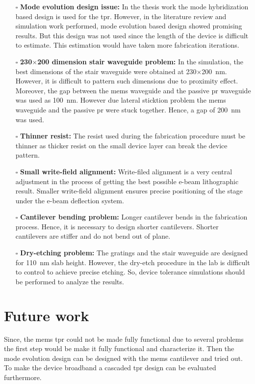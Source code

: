 \documentclass[../report.tex]{subfiles}
\begin{document}
\begin{itemize}	
	\item[$\square$] \textbf{Mode evolution design issue:} In the thesis work the mode hybridization based design is used for the \gls{tpr}. However, in the literature review and simulation work performed, mode evolution based design showed promising results. But this design was not used since the length of the device is difficult to estimate. This estimation would have taken more fabrication iterations. 
	\item[$\square$] \textbf{230$\times$200 dimension stair waveguide problem:} In the simulation, the best dimensions of the stair waveguide were obtained at 230$\times$\SI{200}{\nano\meter}. However, it is difficult to pattern such dimensions due to proximity effect. Moreover, the gap between the \gls{mems} waveguide and the passive \gls{pr} waveguide was used as \SI{100}{\nano\meter}. However due lateral sticktion problem the \gls{mems} waveguide and the passive \gls{pr} were stuck together. Hence, a gap of \SI{200}{\nano\meter} was used.
	\item[$\square$] \textbf{Thinner resist:} The resist used during the fabrication procedure must be thinner as thicker resist on the small device layer can break the device pattern.
	\item[$\square$] \textbf{Small write-field alignment:} Write-filed alignment is a very central adjustment in the process of getting the best possible e-beam lithographic result. Smaller write-field alignment ensures precise positioning of the stage under the e-beam deflection system.
	\item[$\square$] \textbf{Cantilever bending problem:} Longer cantilever bends in the fabrication process. Hence,  it is necessary to design shorter cantilevers. Shorter cantilevers are stiffer and do not bend out of plane.
	\item[$\square$] \textbf{Dry-etching problem:} The gratings and the stair waveguide are designed for \SI{110}{\nano \meter} slab height. However, the dry-etch procedure in the lab is difficult to control to achieve precise etching. So, device tolerance simulations should be performed to analyze the results.  
	
\end{itemize}
	
	\section{Future work} 
	Since, the \gls{mems} \gls{tpr} could not be made fully functional due to several problems the first step would be make it fully functional and characterize it. Then the mode evolution design can be 
	designed with the \gls{mems} cantilever and tried out. To make the device broadband a cascaded \gls{tpr} design can be evaluated furthermore.
	
\end{document}

